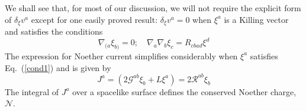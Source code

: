 \documentclass[12pt]{iopart}
\def\eq#1{{Eq.~(\ref{#1})}}
\begin{document}
 
 We shall see that, for most of our discussion,  we will not require the explicit form of $\delta_{\xi}v^a$ except for one easily proved  result:
$
\delta_{\xi}v^a=0
$
when $\xi^a$ is a Killing vector and satisfies the conditions
\begin{equation}
 \nabla_{( a} \xi_{b)} = 0;\quad  \nabla_a \nabla_b \xi_c = R_{c b a d} \xi^d
 \label{cond1}
\end{equation}
The expression for Noether current simplifies considerably when $\xi^a$ 
satisfies \eq{cond1}  and is given by
\begin{equation}
 J^a = \left( 2\mathcal{G}^{ab} \xi_b + L\xi^a  \right)
 =2\mathcal{R}^{ab} \xi_b
 \label{current1}
\end{equation}
The integral of $J^a$ over a spacelike surface defines the conserved Noether charge, $\mathcal{N}$. 
\end{document}
